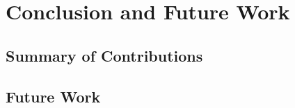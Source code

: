 \chapter{Conclusion and Future Work}
\label{ch:conclusion}


\section{Summary of Contributions}

\section{Future Work}
